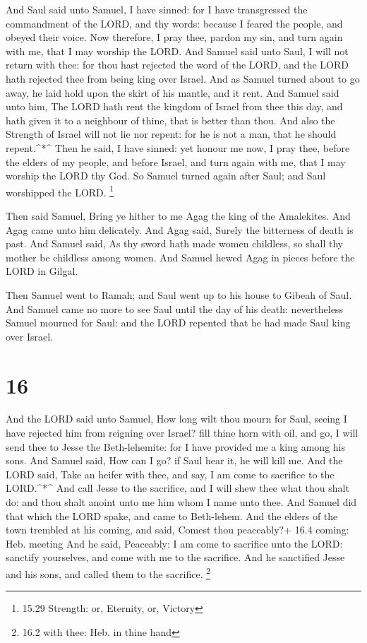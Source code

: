  And Saul said unto Samuel, I have sinned: for I have
transgressed the commandment of the LORD, and thy words: because I
feared the people, and obeyed their voice.  Now therefore,
I pray thee, pardon my sin, and turn again with me, that I may worship
the LORD.  And Samuel said unto Saul, I will not return
with thee: for thou hast rejected the word of the LORD, and the LORD
hath rejected thee from being king over Israel.  And as
Samuel turned about to go away, he laid hold upon the skirt of his
mantle, and it rent.  And Samuel said unto him, The LORD
hath rent the kingdom of Israel from thee this day, and hath given it to
a neighbour of thine, that is better than thou.  And also
the Strength of Israel will not lie nor repent: for he is not a man,
that he should repent.\^{}*\^{}  Then he said, I have
sinned: yet honour me now, I pray thee, before the elders of my people,
and before Israel, and turn again with me, that I may worship the LORD
thy God.  So Samuel turned again after Saul; and Saul
worshipped the LORD. \footnote{15.29 Strength: or, Eternity, or, Victory}

 Then said Samuel, Bring ye hither to me Agag the king of
the Amalekites. And Agag came unto him delicately. And Agag said, Surely
the bitterness of death is past.  And Samuel said, As thy
sword hath made women childless, so shall thy mother be childless among
women. And Samuel hewed Agag in pieces before the LORD in Gilgal.

 Then Samuel went to Ramah; and Saul went up to his house
to Gibeah of Saul.  And Samuel came no more to see Saul
until the day of his death: nevertheless Samuel mourned for Saul: and
the LORD repented that he had made Saul king over Israel.

\hypertarget{section-15}{%
\section{16}\label{section-15}}

 And the LORD said unto Samuel, How long wilt thou mourn for
Saul, seeing I have rejected him from reigning over Israel? fill thine
horn with oil, and go, I will send thee to Jesse the Beth-lehemite: for
I have provided me a king among his sons.  And Samuel said,
How can I go? if Saul hear it, he will kill me. And the LORD said, Take
an heifer with thee, and say, I am come to sacrifice to the
LORD.\^{}*\^{}  And call Jesse to the sacrifice, and I will
shew thee what thou shalt do: and thou shalt anoint unto me him whom I
name unto thee.  And Samuel did that which the LORD spake,
and came to Beth-lehem. And the elders of the town trembled at his
coming, and said, Comest thou peaceably?+ 16.4 coming: Heb. meeting
 And he said, Peaceably: I am come to sacrifice unto the
LORD: sanctify yourselves, and come with me to the sacrifice. And he
sanctified Jesse and his sons, and called them to the sacrifice.
\footnote{16.2 with thee: Heb. in thine hand}

